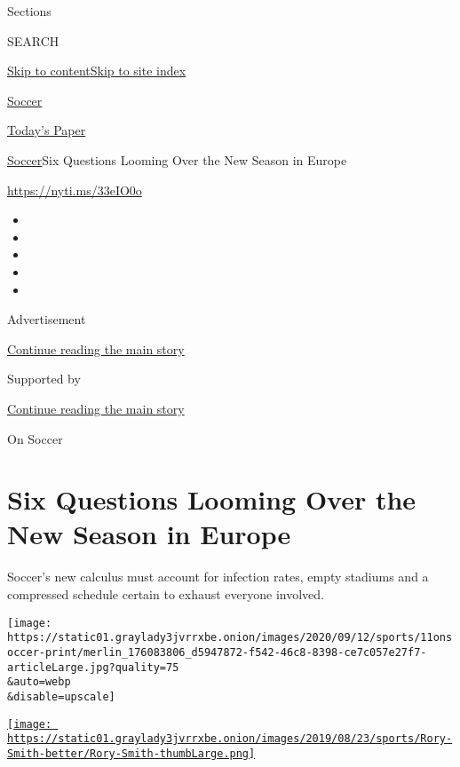 Sections

SEARCH

\protect\hyperlink{site-content}{Skip to
content}\protect\hyperlink{site-index}{Skip to site index}

\href{https://www.nytimes3xbfgragh.onion/section/sports/soccer}{Soccer}

\href{https://myaccount.nytimes3xbfgragh.onion/auth/login?response_type=cookie\&client_id=vi}{}

\href{https://www.nytimes3xbfgragh.onion/section/todayspaper}{Today's
Paper}

\href{/section/sports/soccer}{Soccer}\textbar{}Six Questions Looming
Over the New Season in Europe

\url{https://nyti.ms/33eIO0o}

\begin{itemize}
\item
\item
\item
\item
\item
\end{itemize}

Advertisement

\protect\hyperlink{after-top}{Continue reading the main story}

Supported by

\protect\hyperlink{after-sponsor}{Continue reading the main story}

On Soccer

\hypertarget{six-questions-looming-over-the-new-season-in-europe}{%
\section{Six Questions Looming Over the New Season in
Europe}\label{six-questions-looming-over-the-new-season-in-europe}}

Soccer's new calculus must account for infection rates, empty stadiums
and a compressed schedule certain to exhaust everyone involved.

\texttt{[image: https://static01.graylady3jvrrxbe.onion/images/2020/09/12/sports/11onsoccer-print/merlin\_176083806\_d5947872-f542-46c8-8398-ce7c057e27f7-articleLarge.jpg?quality=75\\\&auto=webp\\\&disable=upscale]}

\href{https://www.nytimes3xbfgragh.onion/by/rory-smith}{\texttt{[image: https://static01.graylady3jvrrxbe.onion/images/2019/08/23/sports/Rory-Smith-better/Rory-Smith-thumbLarge.png]}}


